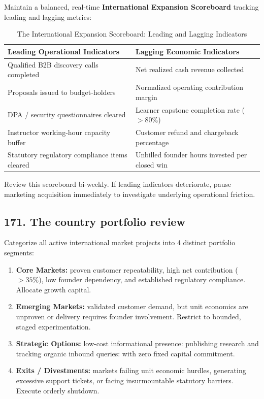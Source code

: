 Maintain a balanced, real-time \textbf{International Expansion Scoreboard} tracking leading and lagging metrics:

\begin{table}[htbp]
\centering
\small
\caption{The International Expansion Scoreboard: Leading and Lagging Indicators}
\label{tab:expansion_scoreboard}
\begin{tabularx}{\columnwidth}{p{3.4cm} X}
\toprule
\textbf{Leading Operational Indicators} & \textbf{Lagging Economic Indicators} \\
\midrule
Qualified B2B discovery calls completed & Net realized cash revenue collected \\
Proposals issued to budget-holders & Normalized operating contribution margin \\
DPA / security questionnaires cleared & Learner capstone completion rate ($>80\%$) \\
Instructor working-hour capacity buffer & Customer refund and chargeback percentage \\
Statutory regulatory compliance items cleared & Unbilled founder hours invested per closed win \\
\bottomrule
\end{tabularx}
\end{table}

Review this scoreboard bi-weekly. If leading indicators deteriorate, pause marketing acquisition immediately to investigate underlying operational friction.

\subsection{171. The country portfolio review}

Categorize all active international market projects into 4 distinct portfolio segments:
\begin{enumerate}
    \item \textbf{Core Markets:} proven customer repeatability, high net contribution ($>35\%$), low founder dependency, and established regulatory compliance. Allocate growth capital.
    \item \textbf{Emerging Markets:} validated customer demand, but unit economics are unproven or delivery requires founder involvement. Restrict to bounded, staged experimentation.
    \item \textbf{Strategic Options:} low-cost informational presence: publishing research and tracking organic inbound queries: with zero fixed capital commitment.
    \item \textbf{Exits / Divestments:} markets failing unit economic hurdles, generating excessive support tickets, or facing insurmountable statutory barriers. Execute orderly shutdown.
\end{enumerate}

